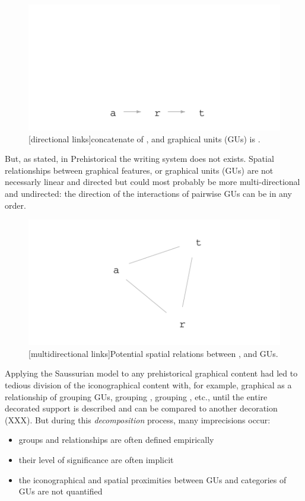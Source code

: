 \documentclass[article]{jss}
\begin{document}
\begin{figure}[H]
\includegraphics{article_rvTH12-art_only}
[directional links]{concatenate of ,  and  graphical units (GUs) is .}
\end{figure}
But, as stated, in Prehistorical the writing system does not exists. Spatial relationships between graphical features, or graphical units (GUs) are not necessarly linear and directed but could most probably be more multi-directional and undirected: the direction of the interactions of pairwise GUs can be in any order.  

\begin{figure}[H]
\includegraphics{article_rvTH12-art_or_rat}
[multidirectional links]{Potential spatial relations between ,  and  GUs.}
\end{figure}

Applying the Saussurian model to any prehistorical graphical content had led to tedious division of the iconographical content with, for example, graphical as a relationship of  grouping GUs,  grouping ,  grouping , etc., until the entire decorated support is described and can be compared to another decoration (XXX). But during this \emph{decomposition} process, many imprecisions occur:
\begin{itemize}
  \item groups and relationships are often defined empirically
  \item their level of significance are often implicit 
  \item the iconographical and spatial proximities between GUs and categories of GUs are not quantified
\end{itemize}
\end{document}
